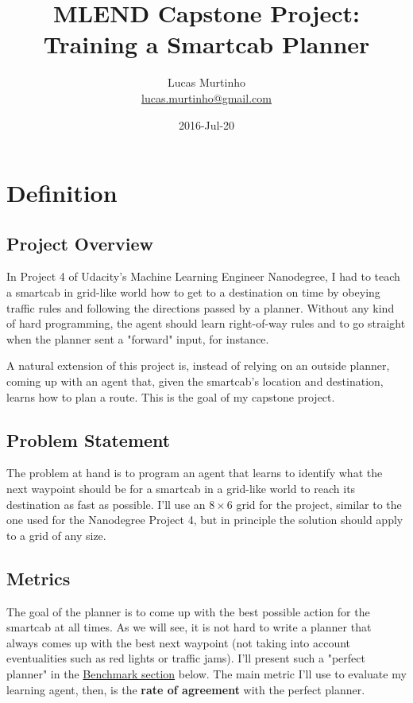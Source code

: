 \documentclass{article}
\title{MLEND Capstone Project: Training a Smartcab Planner}
\author{Lucas Murtinho \\ \url{lucas.murtinho@gmail.com}}
\date{2016-Jul-20}
\begin{document}
\maketitle
\tableofcontents
\newpage

\section{Definition}


\subsection{Project Overview}

In Project 4 of Udacity's Machine Learning Engineer Nanodegree, I had to teach a smartcab in grid-like world how to get to a destination on time by obeying traffic rules and following the directions passed by a planner. Without any kind of hard programming, the agent should learn right-of-way rules and to go straight when the planner sent a "forward" input, for instance.

A natural extension of this project is, instead of relying on an outside planner, coming up with an agent that, given the smartcab's location and destination, learns how to plan a route. This is the goal of my capstone project.


\subsection{Problem Statement}

The problem at hand is to program an agent that learns to identify what the next waypoint should be for a smartcab in a grid-like world to reach its destination as fast as possible. I'll use an $8\times6$ grid for the project, similar to the one used for the Nanodegree Project 4, but in principle the solution should apply to a grid of any size.


\subsection{Metrics}

The goal of the planner is to come up with the best possible action for the smartcab at all times. As we will see, it is not hard to write a planner that always comes up with the best next waypoint (not taking into account eventualities such as red lights or traffic jams). I'll present such a "perfect planner" in the \hyperref[sec:benchmark]{Benchmark section} below. The main metric I'll use to evaluate my learning agent, then, is the \textbf{rate of agreement} with the perfect planner.
\end{document}
